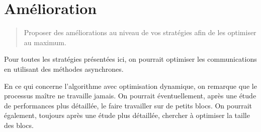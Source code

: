 \section{Amélioration}

\question
\label{mandel:q:5}

\begin{quotation}
  Proposer des améliorations au niveau de vos stratégies afin de les
  optimiser au maximum.
\end{quotation}


Pour toutes les stratégies présentées ici, on pourrait optimiser les
communications en utilisant des méthodes asynchrones.

En ce qui concerne l'algorithme avec optimisation dynamique, on
remarque que le processus maître ne travaille jamais. On pourrait
éventuellement, après une étude de performances plus détaillée, le
faire travailler sur de petits blocs. On pourrait également, toujours
après une étude plus détaillée, chercher à optimiser la taille des
blocs.


